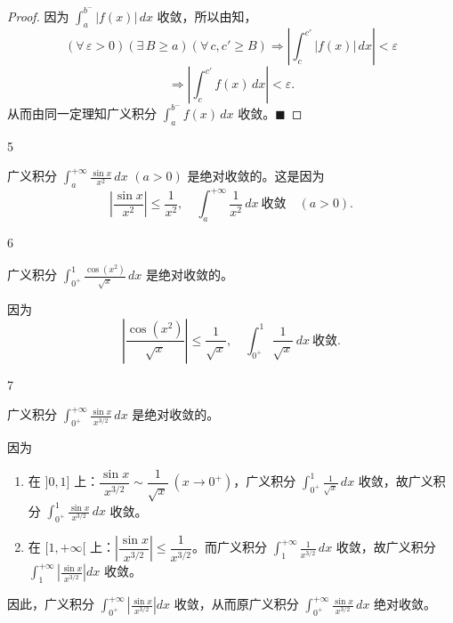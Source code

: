 \begin{proof}

因为 $\displaystyle\int_a^{b^-}|f(x)|\,dx$ 收敛，所以由知，
\[(\forall\,\varepsilon>0)(\exists\,B\geqslant a)(\forall\,c,c'\geqslant B)\Longrightarrow\left|\int_c^{c'}|f(x)|\,dx\right|<\varepsilon\]
\[\Longrightarrow\left|\int_c^{c'}f(x)\,dx\right|<\varepsilon.\]
从而由同一定理知广义积分 $\displaystyle\int_a^{b^-}f(x)\,dx$ 收敛。$\blacksquare$

\end{proof}

\begin{sourceexample}{5}

广义积分 $\displaystyle\int_a^{+\infty}\frac{\sin x}{x^2}\,dx$ $(a>0)$ 是绝对收敛的。这是因为
\[\left|\frac{\sin x}{x^2}\right|\leqslant\frac{1}{x^2},\quad\int_a^{+\infty}\frac{1}{x^2}\,dx\ \text{收敛}\quad(a>0).\]

\end{sourceexample}

\begin{sourceexample}{6}

广义积分 $\displaystyle\int_{0^+}^1\frac{\cos(x^2)}{\sqrt{x}}\,dx$ 是绝对收敛的。

因为
\[\left|\frac{\cos(x^2)}{\sqrt{x}}\right|\leqslant\frac{1}{\sqrt{x}},\quad\int_{0^+}^1\frac{1}{\sqrt{x}}\,dx\ \text{收敛}.\]

\end{sourceexample}

\begin{sourceexample}{7}

广义积分 $\displaystyle\int_{0^+}^{+\infty}\frac{\sin x}{x^{3/2}}\,dx$ 是绝对收敛的。

因为
\begin{enumerate}[label=\roman{enumi})]
\item 在 $]0,1]$ 上：$\dfrac{\sin x}{x^{3/2}}\sim\dfrac{1}{\sqrt{x}}\ (x\to0^+)$，广义积分 $\displaystyle\int_{0^+}^1\frac{1}{\sqrt{x}}\,dx$ 收敛，故广义积分 $\displaystyle\int_{0^+}^1\frac{\sin x}{x^{3/2}}\,dx$ 收敛。
\item 在 $[1,+\infty[$ 上：$\left|\dfrac{\sin x}{x^{3/2}}\right|\leqslant\dfrac{1}{x^{3/2}}$。而广义积分 $\displaystyle\int_1^{+\infty}\frac{1}{x^{3/2}}\,dx$ 收敛，故广义积分 $\displaystyle\int_1^{+\infty}\left|\frac{\sin x}{x^{3/2}}\right|dx$ 收敛。
\end{enumerate}

因此，广义积分 $\displaystyle\int_{0^+}^{+\infty}\left|\frac{\sin x}{x^{3/2}}\right|dx$ 收敛，从而原广义积分 $\displaystyle\int_{0^+}^{+\infty}\frac{\sin x}{x^{3/2}}\,dx$ 绝对收敛。

\end{sourceexample}

